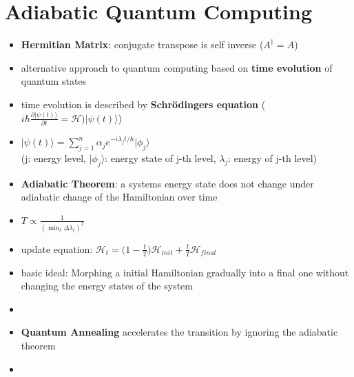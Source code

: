 \documentclass[12pt,a4paper]{article}
\newcommand{\ket}[1]{\vert #1 \rangle}
\begin{document}
\section{Adiabatic Quantum Computing}
\begin{itemize}
\item \textbf{Hermitian Matrix}: conjugate transpose is self inverse ($A^\dagger = A$)
\item alternative approach to quantum computing based on \textbf{time evolution} of quantum states
\item time evolution is described by \textbf{Schrödingers equation} ($i\hbar \frac{\partial\ket{\psi(t)}}{\partial t} = \mathscr{H)}\ket{\psi(t)}$)
\item $\ket{\psi(t)} = \displaystyle \sum_{j=1}^n \alpha_j e^{-i\lambda_j t / \hbar}\ket{\phi_j}$\\(j: energy level, $\ket{\phi_j}$: energy state of j-th level, $\lambda_j$: energy of j-th level)
\item \textbf{Adiabatic Theorem}: a systems energy state does not change under adiabatic change of the Hamiltonian over time
\item $T \propto \frac{1}{(\min_t \Delta \lambda_t)^2}$
\item update equation: $\mathscr{H}_t = \big( 1-\frac{t}{T}\big) \mathscr{H}_{init}+\frac{t}{T}\mathscr{H}_{final}$
\item basic ideal: Morphing a initial Hamiltonian gradually into a final one without changing the energy states of the system
\item {}
\item \textbf{Quantum Annealing} accelerates the transition by ignoring the adiabatic theorem
\item 
\end{itemize}
\end{document}

